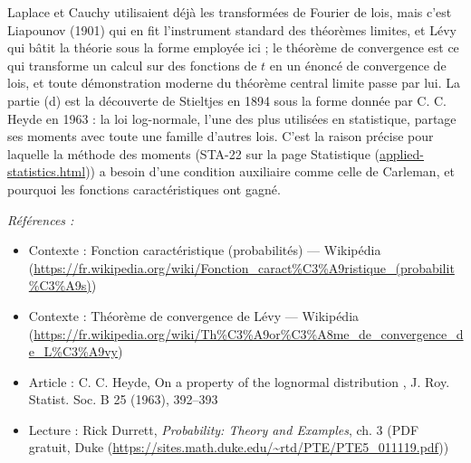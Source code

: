 \documentclass[11pt]{article}
\newenvironment{refs}{\par\small\noindent\emph{Références :}\begin{itemize}\setlength\itemsep{0pt}}{\end{itemize}\normalsize}
\begin{document}
\noindent Laplace et Cauchy utilisaient déjà les transformées de Fourier de lois, mais
c'est Liapounov (1901) qui en fit l'instrument standard des théorèmes limites, et Lévy qui bâtit la
théorie sous la forme employée ici ; le théorème de convergence est ce qui transforme un calcul sur
des fonctions de $ t $ en un énoncé de convergence de lois, et toute démonstration moderne du
théorème central limite passe par lui. La partie (d) est la découverte de Stieltjes en 1894 sous la
forme donnée par C. C. Heyde en 1963 : la loi log-normale, l'une des plus utilisées en statistique,
partage ses moments avec toute une famille d'autres lois. C'est la raison précise pour laquelle la
méthode des moments (STA-22 sur la page Statistique (\url{applied-statistics.html})) a besoin
d'une condition auxiliaire comme celle de Carleman, et pourquoi les fonctions caractéristiques ont
gagné.

\begin{refs}
\item Contexte : Fonction caractéristique (probabilités) --- Wikipédia (\url{https://fr.wikipedia.org/wiki/Fonction_caract%C3%A9ristique_(probabilit%C3%A9s)})
\item Contexte : Théorème de convergence de Lévy --- Wikipédia (\url{https://fr.wikipedia.org/wiki/Th%C3%A9or%C3%A8me_de_convergence_de_L%C3%A9vy})
\item Article : C. C. Heyde, \og{} On a property of the lognormal distribution \fg{}, J. Roy. Statist. Soc. B 25 (1963), 392--393
\item Lecture : Rick Durrett, \textit{Probability: Theory and Examples}, ch. 3 (PDF gratuit, Duke (\url{https://sites.math.duke.edu/~rtd/PTE/PTE5_011119.pdf}))
\end{refs}

\bigskip
\end{document}
